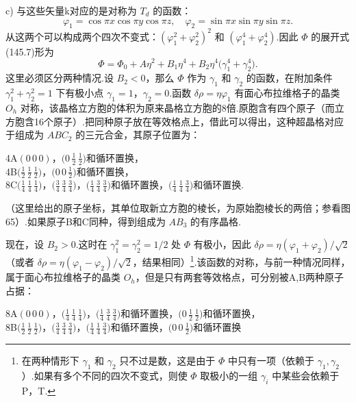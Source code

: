 c) 与这些矢量k对应的是对称为 $T_d$ 的函数：
\begin{equation}
  \varphi_1=\cos\pi x\cos\pi y\cos\pi z,\quad
  \varphi_2=\sin\pi x\sin\pi y\sin\pi z.
\end{equation}
从这两个可以构成两个四次不变式：$(\varphi_1^2+\varphi_2^2)^2$ 和 $(\varphi_1^4+\varphi_2^4)$.因此 $\Phi$ 的展开式(145.7)形为
\begin{equation}
  \Phi=\Phi_0+A\eta^2+B_1\eta^4+B_2\eta^4\bigl(\gamma_1^4+\gamma_2^4\bigr).
\end{equation}
这里必须区分两种情况.设 $B_2<0$，那么 $\Phi$ 作为 $\gamma_1$ 和 $\gamma_2$ 的函数，在附加条件 $\gamma_1^2+\gamma_2^2=1$ 下有极小点 $\gamma_1=1$，$\gamma_2=0$.函数 $\delta\rho=\eta\varphi_1$ 有面心布拉维格子的晶类 $O_h$ 对称，该晶格立方胞的体积为原来晶格立方胞的8倍.原胞含有四个原子（而立方胞含16个原子）.把同种原子放在等效格点上，借此可以得出，这种超晶格对应于组成为 $ABC_2$ 的三元合金，其原子位置为：

\begin{flushleft}
\hspace{2em}4A\quad $(0\,0\,0)$，$\bigl(0\,\frac{1}{2}\,\frac{1}{2}\bigr)$和循环置换，\\
\hspace{2em}4B\quad $\bigl(\frac{1}{2}\,\frac{1}{2}\,\frac{1}{2}\bigr)$，$\bigl(0\,0\,\frac{1}{2}\bigr)$和循环置换，\\
\hspace{2em}8C\quad $\bigl(\frac{1}{4}\,\frac{1}{4}\,\frac{1}{4}\bigr)$，$\bigl(\frac{3}{4}\,\frac{3}{4}\,\frac{3}{4}\bigr)$，$\bigl(\frac{1}{4}\,\frac{3}{4}\,\frac{3}{4}\bigr)$和循环置换，$\bigl(\frac{1}{4}\,\frac{1}{4}\,\frac{3}{4}\bigr)$和循环置换.
\end{flushleft}

（这里给出的原子坐标，其单位取新立方胞的棱长，为原始胞棱长的两倍；参看图65）.如果原子B和C同种，得到组成为 $AB_3$ 的有序晶格.

现在，设 $B_2>0$.这时在 $\gamma_1^2=\gamma_2^2=1/2$ 处 $\Phi$ 有极小，因此 $\delta\rho=\eta(\varphi_1+\varphi_2)/\sqrt{2}$（或者 $\delta\rho=\eta(\varphi_1-\varphi_2)/\sqrt{2}$，结果相同）\footnote{在两种情形下 $\gamma_1$ 和 $\gamma_2$ 只不过是数，这是由于 $\Phi$ 中只有一项（依赖于 $\gamma_1,\gamma_2$）.如果有多个不同的四次不变式，则使 $\Phi$ 取极小的一组 $\gamma_i$ 中某些会依赖于P，T.}.该函数的对称，与前一种情况同样，属于面心布拉维格子的晶类 $O_h$，但是只有两套等效格点，可分别被A,B两种原子占据：

\begin{flushleft}
\hspace{2em}8A\quad $(0\,0\,0)$，$\bigl(\frac{1}{4}\,\frac{1}{4}\,\frac{1}{4}\bigr)$，$\bigl(\frac{1}{4}\,\frac{3}{4}\,\frac{3}{4}\bigr)$和循环置换，$\bigl(0\,\frac{1}{2}\,\frac{1}{2}\bigr)$和循环置换，\\
\hspace{2em}8B\quad $\bigl(\frac{1}{2}\,\frac{1}{2}\,\frac{1}{2}\bigr)$，$\bigl(\frac{3}{4}\,\frac{3}{4}\,\frac{3}{4}\bigr)$，$\bigl(\frac{1}{4}\,\frac{1}{4}\,\frac{3}{4}\bigr)$和循环置换，$\bigl(0\,0\,\frac{1}{2}\bigr)$和循环置换
\end{flushleft}

